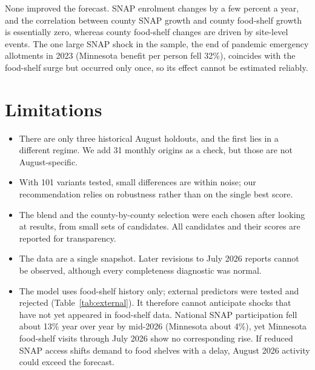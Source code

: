 \documentclass[11pt,letterpaper]{article}
\begin{document}
\noindent None improved the forecast. SNAP enrolment changes by a few percent a year, and the
correlation between county SNAP growth and county food-shelf growth is essentially zero, whereas county
food-shelf changes are driven by site-level events. The one large SNAP shock in the sample, the end of
pandemic emergency allotments in 2023 (Minnesota benefit per person fell 32\%), coincides with the
food-shelf surge but occurred only once, so its effect cannot be estimated reliably.

\section{Limitations}
\begin{itemize}
  \item There are only three historical August holdouts, and the first lies in a different regime.
        We add 31 monthly origins as a check, but those are not August-specific.
  \item With 101 variants tested, small differences are within noise; our recommendation relies on
        robustness rather than on the single best score.
  \item The blend and the county-by-county selection were each chosen after looking at results, from
        small sets of candidates. All candidates and their scores are reported for transparency.
  \item The data are a single snapshot. Later revisions to July 2026 reports cannot be observed,
        although every completeness diagnostic was normal.
  \item The model uses food-shelf history only; external predictors were tested and rejected
        (Table~\ref{tab:external}). It therefore cannot anticipate shocks that have not yet appeared in
        food-shelf data. National SNAP participation fell about 13\% year over year by mid-2026 (Minnesota
        about 4\%), yet Minnesota food-shelf visits through July 2026 show no corresponding rise. If reduced
        SNAP access shifts demand to food shelves with a delay, August 2026 activity could exceed the forecast.
\end{itemize}
\end{document}
